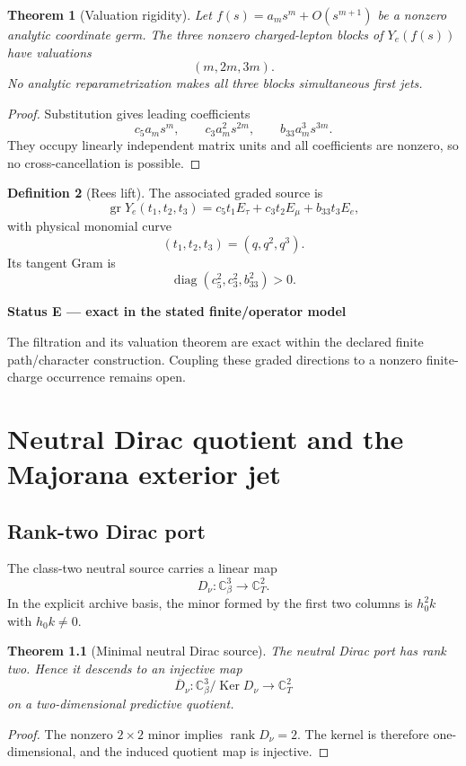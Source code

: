 \documentclass[11pt,oneside,openany]{book}
\numberwithin{equation}{chapter}
\newtheorem{theorem}{Theorem}[chapter]
\theoremstyle{definition}
\newtheorem{definition}[theorem]{Definition}
\theoremstyle{remark}
\newcommand{\C}{\mathbb C}
\newcommand{\rank}{\operatorname{rank}}
\newcommand{\Ker}{\operatorname{Ker}}
\newcommand{\diag}{\operatorname{diag}}
\newenvironment{statusbox}[2]{%
  \par\medskip\noindent
  \begin{center}\begin{minipage}{0.94\textwidth}
  \colorbox{#1!8}{\parbox{\dimexpr\linewidth-2\fboxsep\relax}{\textbf{#2}}}\par\smallskip
}{%
  \end{minipage}\end{center}\medskip
}
\newcommand{\Exact}[1]{\begin{statusbox}{ExactColor}{Status E --- exact in the stated finite/operator model}#1\end{statusbox}}
\begin{document}
\begin{theorem}[Valuation rigidity]
\label{thm:valuation-rigidity}
Let $f(s)=a_ms^m+O(s^{m+1})$ be a nonzero analytic coordinate germ.  The three nonzero charged-lepton blocks of $Y_e(f(s))$ have valuations
\[
 \boxed{(m,2m,3m).}
\]
No analytic reparametrization makes all three blocks simultaneous first jets.
\end{theorem}

\begin{proof}
Substitution gives leading coefficients
\[
 c_5a_ms^m,
 \qquad
 c_3a_m^2s^{2m},
 \qquad
 b_{33}a_m^3s^{3m}.
\]
They occupy linearly independent matrix units and all coefficients are nonzero, so no cross-cancellation is possible.
\end{proof}

\begin{definition}[Rees lift]
The associated graded source is
\[
 \operatorname{gr}Y_e(t_1,t_2,t_3)
 =c_5t_1E_\tau+c_3t_2E_\mu+b_{33}t_3E_e,
\]
with physical monomial curve
\[
 (t_1,t_2,t_3)=(q,q^2,q^3).
\]
Its tangent Gram is
\[
 \diag(c_5^2,c_3^2,b_{33}^2)>0.
\]
\end{definition}

\Exact{The filtration and its valuation theorem are exact within the declared finite path/character construction.  Coupling these graded directions to a nonzero finite-charge occurrence remains open.}

\chapter{Neutral Dirac quotient and the Majorana exterior jet}
\label{ch:neutral}

\section{Rank-two Dirac port}
The class-two neutral source carries a linear map
\[
 D_\nu:\C^3_\beta\longrightarrow\C^2_T.
\]
In the explicit archive basis, the minor formed by the first two columns is $h_0^2k$ with $h_0k\ne0$.

\begin{theorem}[Minimal neutral Dirac source]
\label{thm:neutral-rank-two}
The neutral Dirac port has rank two.  Hence it descends to an injective map
\[
 \boxed{
 \overline D_\nu:\C^3_\beta/\Ker D_\nu\longrightarrow\C^2_T
 }
\]
on a two-dimensional predictive quotient.
\end{theorem}

\begin{proof}
The nonzero $2\times2$ minor implies $\rank D_\nu=2$.  The kernel is therefore one-dimensional, and the induced quotient map is injective.
\end{proof}
\end{document}

